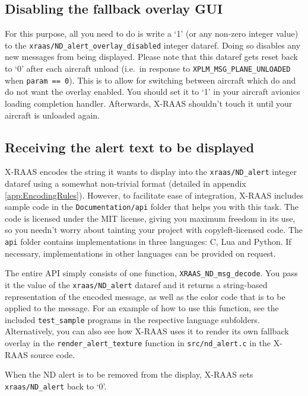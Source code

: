 \documentclass[a4paper,12pt]{article}
\newcommand{\code}[1]{\texttt{#1}}
\newcommand{\dataref}[1]{\texttt{#1}}
\begin{document}
\subsection{Disabling the fallback overlay GUI}

For this purpose, all you need to do is write a `1' (or any non-zero
integer value) to the \dataref{xraas/ND\_alert\_overlay\_disabled}
integer dataref. Doing so disables any new messages from being displayed.
Please note that this dataref gets reset back to `0' after each aircraft
unload (i.e.\ in response to \code{XPLM\_MSG\_PLANE\_UNLOADED} when
\code{param == 0}). This is to allow for switching between aircraft which
do and do not want the overlay enabled. You should set it to `1' in your
aircraft avionics loading completion handler. Afterwards, X-RAAS
shouldn't touch it until your aircraft is unloaded again.

\subsection{Receiving the alert text to be displayed}

X-RAAS encodes the string it wants to display into the
\dataref{xraas/ND\_alert} integer dataref using a somewhat non-trivial
format (detailed in appendix \ref{app:EncodingRules}). However, to
facilitate ease of integration, X-RAAS includes sample code in the
\texttt{Documentation/api} folder that helps you with this task. The code
is licensed under the MIT license, giving you maximum freedom in its use,
so you needn't worry about tainting your project with copyleft-licensed
code. The \texttt{api} folder contains implementations in three
languages: C, Lua and Python. If necessary, implementations in other
languages can be provided on request.

The entire API simply consists of one function,
\code{XRAAS\_ND\_msg\_decode}. You pass it the value of the
\code{xraas/ND\_alert} dataref and it returns a string-based
representation of the encoded message, as well as the color code that is
to be applied to the message. For an example of how to use this function,
see the included \texttt{test\_sample} programs in the respective
language subfolders. Alternatively, you can also see how X-RAAS uses it
to render its own fallback overlay in the \code{render\_alert\_texture}
function in \texttt{src/nd\_alert.c} in the X-RAAS source code.

When the ND alert is to be removed from the display, X-RAAS sets
\dataref{xraas/ND\_alert} back to `0'.
\end{document}
